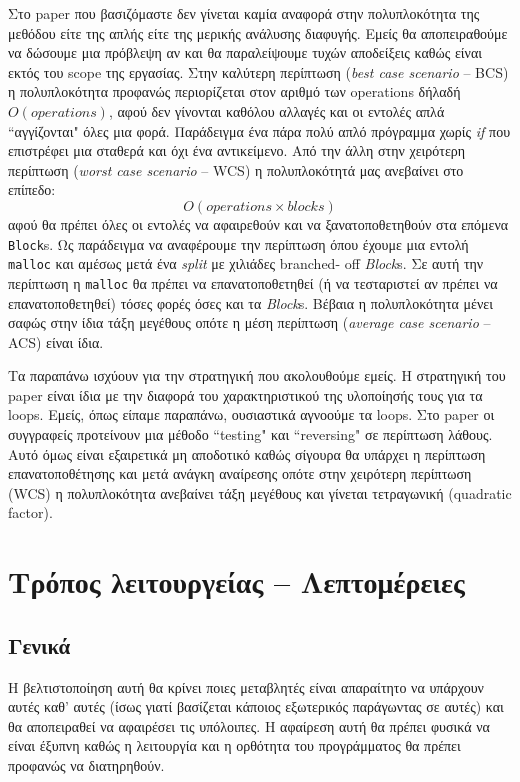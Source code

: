 Στο paper που βασιζόμαστε\cite{stadler2014partial} δεν γίνεται καμία αναφορά
στην πολυπλοκότητα της μεθόδου είτε της απλής είτε της μερικής ανάλυσης
διαφυγής. Εμείς θα αποπειραθούμε να δώσουμε μια πρόβλεψη αν και θα
παραλείψουμε τυχών αποδείξεις καθώς είναι εκτός του scope της εργασίας. Στην
καλύτερη περίπτωση (\textit{best case scenario} – BCS) η πολυπλοκότητα
προφανώς περιορίζεται στον αριθμό των operations δήλαδή $O(operations)$, αφού
δεν γίνονται καθόλου αλλαγές και οι εντολές απλά ``αγγίζονται" όλες μια φορά.
Παράδειγμα ένα πάρα πολύ απλό πρόγραμμα χωρίς \textit{if} που επιστρέφει μια
σταθερά και όχι ένα αντικείμενο. Από την άλλη στην χειρότερη περίπτωση
(\textit{worst case scenario} – WCS) η πολυπλοκότητά μας ανεβαίνει στο
επίπεδο:
\[
O(operations \times blocks)
\]
αφού θα πρέπει όλες οι εντολές να αφαιρεθούν και να ξανατοποθετηθούν στα επόμενα
\texttt{Block}s. Ως παράδειγμα να αναφέρουμε την περίπτωση όπου έχουμε μια
εντολή \texttt{malloc} και αμέσως μετά ένα \textit{split} με χιλιάδες branched-
off \textit{Block}s. Σε αυτή την περίπτωση η \texttt{malloc} θα πρέπει να
επανατοποθετηθεί (ή να τεσταριστεί αν πρέπει να επανατοποθετηθεί) τόσες φορές
όσες και τα \textit{Block}s. Βέβαια η πολυπλοκότητα μένει σαφώς στην ίδια τάξη
μεγέθους οπότε η μέση περίπτωση (\textit{average case scenario} – ACS) είναι
ίδια.

Τα παραπάνω ισχύουν για την στρατηγική που ακολουθούμε εμείς. Η στρατηγική του
paper είναι ίδια με την διαφορά του χαρακτηριστικού της υλοποίησής τους για τα
loops. Εμείς, όπως είπαμε παραπάνω, ουσιαστικά αγνοούμε τα loops. Στο paper οι
συγγραφείς προτείνουν μια μέθοδο ``testing" και ``reversing" σε περίπτωση λάθους.
Αυτό όμως είναι εξαιρετικά μη αποδοτικό καθώς σίγουρα θα υπάρχει η περίπτωση
επανατοποθέτησης και μετά ανάγκη αναίρεσης οπότε στην χειρότερη περίπτωση (WCS)
η πολυπλοκότητα ανεβαίνει τάξη μεγέθους και γίνεται τετραγωνική (quadratic
factor).


\section{Τρόπος λειτουργείας – Λεπτομέρειες} %

\subsection{Γενικά}

Η βελτιστοποίηση αυτή θα κρίνει ποιες μεταβλητές είναι απαραίτητο να υπάρχουν
αυτές καθ' αυτές (ίσως γιατί βασίζεται κάποιος εξωτερικός παράγωντας σε αυτές)
και θα αποπειραθεί να αφαιρέσει τις υπόλοιπες. Η αφαίρεση αυτή θα πρέπει φυσικά
να είναι έξυπνη καθώς η λειτουργία και η ορθότητα του προγράμματος θα πρέπει
προφανώς να διατηρηθούν.

